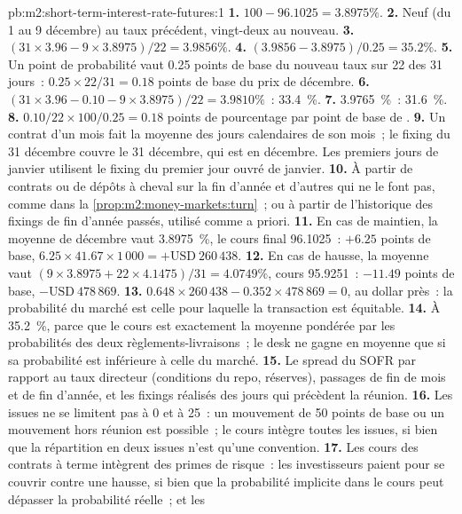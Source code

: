 \begin{solution}{pb:m2:short-term-interest-rate-futures:1}
\textbf{1.} $100 - 96.1025 = 3.8975\%$.
\textbf{2.} Neuf (du 1 au 9 décembre) au taux précédent, vingt-deux au nouveau.
\textbf{3.} $(31 \times 3.96 - 9 \times 3.8975)/22 = 3.9856\%$.
\textbf{4.} $(3.9856 - 3.8975)/0.25 = 35.2\%$.
\textbf{5.} Un point de probabilité vaut 0.25 points de base du nouveau taux sur 22 des
31 jours~: $0.25 \times 22/31 = 0.18$ points de base du prix de décembre.
\textbf{6.} $(31 \times 3.96 - 0.10 - 9 \times 3.8975)/22 = 3.9810\%$~: 33.4~\%.
\textbf{7.} 3.9765~\%~: 31.6~\%.
\textbf{8.} $0.10/22 \times 100/0.25 = 0.18$ points de pourcentage par point de base de
.
\textbf{9.} Un contrat d'un mois fait la moyenne des jours calendaires de son mois~; le
fixing du 31 décembre couvre le 31 décembre, qui est en décembre. Les premiers jours de janvier
utilisent le fixing du premier jour ouvré de janvier.
\textbf{10.} À partir de contrats ou de dépôts à cheval sur la fin d'année et d'autres qui
ne le font pas, comme dans la \cref{prop:m2:money-markets:turn}~; ou à partir de l'historique des
fixings de fin d'année passés, utilisé comme a priori.
\textbf{11.} En cas de maintien, la moyenne de décembre vaut 3.8975~\%, le cours final 96.1025~:
$+6.25$ points de base, $6.25 \times 41.67 \times 1\,000 = +\text{USD}~260\,438$.
\textbf{12.} En cas de hausse, la moyenne vaut $(9 \times 3.8975 + 22 \times 4.1475)/31 =
4.0749\%$, cours 95.9251~: $-11.49$ points de base, $-\text{USD}~478\,869$.
\textbf{13.} $0.648 \times 260\,438 - 0.352 \times 478\,869 = 0$, au dollar près~: la
probabilité du marché est celle pour laquelle la transaction est équitable.
\textbf{14.} À 35.2~\%, parce que le cours est exactement la moyenne pondérée
par les probabilités des deux règlements-livraisons~; le desk ne gagne en moyenne que si sa
probabilité est inférieure à celle du marché.
\textbf{15.} Le spread du SOFR par rapport au taux directeur (conditions du repo, réserves),
passages de fin de mois et de fin d'année, et les fixings réalisés des jours qui précèdent la
réunion.
\textbf{16.} Les issues ne se limitent pas à 0 et à 25~: un mouvement de 50 points de base ou un
mouvement hors réunion est possible~; le cours intègre toutes les issues, si bien que la
répartition en deux issues n'est qu'une convention.
\textbf{17.} Les cours des contrats à terme intègrent des primes de risque~: les investisseurs paient pour se couvrir contre une hausse, si bien que
la probabilité implicite dans le cours peut dépasser la probabilité réelle~; et les

\end{solution}
